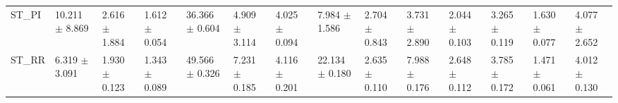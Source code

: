 \begin{tabular}{llllllllllllll}
ST_PI     &  10.211 $ \pm $ 8.869 &  2.616 $ \pm $ 1.884 &  1.612 $ \pm $ 0.054 &  36.366 $ \pm $ 0.604 &   4.909 $ \pm $ 3.114 &   4.025 $ \pm $ 0.094 &   7.984 $ \pm $ 1.586 &   2.704 $ \pm $ 0.843 &   3.731 $ \pm $ 2.890 &  2.044 $ \pm $ 0.103 &   3.265 $ \pm $ 0.119 &  1.630 $ \pm $ 0.077 &   4.077 $ \pm $ 2.652 \\
ST_RR     &   6.319 $ \pm $ 3.091 &  1.930 $ \pm $ 0.123 &  1.343 $ \pm $ 0.089 &  49.566 $ \pm $ 0.326 &   7.231 $ \pm $ 0.185 &   4.116 $ \pm $ 0.201 &  22.134 $ \pm $ 0.180 &   2.635 $ \pm $ 0.110 &   7.988 $ \pm $ 0.176 &  2.648 $ \pm $ 0.112 &   3.785 $ \pm $ 0.172 &  1.471 $ \pm $ 0.061 &   4.012 $ \pm $ 0.130 \\
\bottomrule
\end{tabular}
